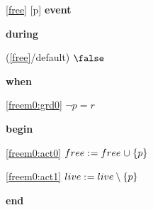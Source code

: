 \noindent \ref{free} [p] \textbf{event}
\begin{block}
  \item   \textbf{during}
  \begin{block}
  \item[ (\ref{free}/default) ]{$\false $} %
  \end{block}
  \item   \textbf{when}
  \begin{block}
  \item[ \eqref{freem0:grd0} ]{$\neg p = r $} %
  \end{block}
  \item   \textbf{begin}
  \begin{block}
  \item[ \eqref{freem0:act0} ]{$free \mathrel{:\mkern1mu=} free \mathbin{\mkern1mu\cup\mkern1mu} \{ p \} $} %
  \item[ \eqref{freem0:act1} ]{$live \mathrel{:\mkern1mu=} live \setminus \{ p \} $} %
  \end{block}
  \item   \textbf{end} \\
\end{block}
